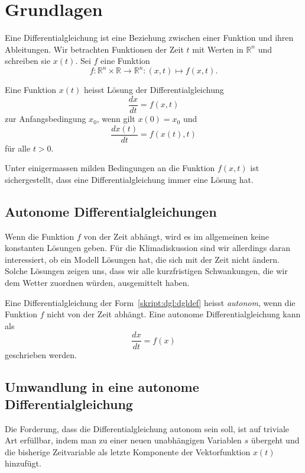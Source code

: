%
%
%
\section{Grundlagen}
Eine Differentialgleichung ist eine Beziehung zwischen einer Funktion und
ihren Ableitungen.
Wir betrachten Funktionen der Zeit $t$ mit Werten in $\mathbb R^n$
und schreiben sie $x(t)$.
Sei $f$ eine Funktion
\[
f\colon \mathbb R^n\times \mathbb R \to \mathbb R^n: (x,t) \mapsto f(x,t).
\]

\begin{definition}
Eine Funktion $x(t)$ heisst Lösung der Differentialgleichung
\begin{equation}
\frac{dx}{dt} = f(x,t)
\label{skript:dgl:dgldef}
\end{equation}
zur Anfangsbedingung $x_0$, wenn gilt $x(0)=x_0$ und
\[
\frac{dx(t)}{dt} = f(x(t),t)
\]
für alle $t>0$.
\end{definition}

Unter einigermassen milden Bedingungen an die Funktion $f(x,t)$ ist
sichergestellt, dass eine Differentialgleichung immer eine Lösung hat.

\subsection{Autonome Differentialgleichungen}
Wenn die Funktion $f$ von der Zeit abhängt, wird es im allgemeinen
keine konstanten Lösungen geben.
Für die Klimadiskussion sind wir allerdings daran interessiert, ob
ein Modell Lösungen hat, die sich mit der Zeit nicht ändern.
Solche Lösungen zeigen uns, dass wir alle kurzfristigen
Schwankungen, die wir dem Wetter zuordnen würden, ausgemittelt haben.

\begin{definition}
Eine Differentialgleichung der Form~\eqref{skript:dgl:dgldef}
heisst {\em autonom},
%
wenn die Funktion $f$ nicht von der Zeit abhängt.
Eine autonome Differentialgleichung kann als
\[
\frac{dx}{dt} = f(x)
\]
geschrieben werden.
\end{definition}

\subsection{Umwandlung in eine autonome Differentialgleichung}
Die Forderung, dass die Differentialgleichung autonom sein soll, ist
auf triviale Art erfüllbar, indem man zu einer neuen
unabhängigen Variablen $s$ übergeht und die bisherige Zeitvariable 
als letzte Komponente der Vektorfunktion $x(t)$ hinzufügt.

